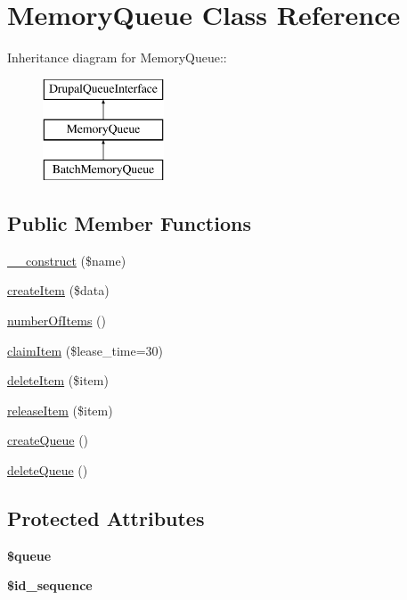 \hypertarget{classMemoryQueue}{
\section{MemoryQueue Class Reference}
\label{classMemoryQueue}
}
Inheritance diagram for MemoryQueue::\begin{figure}[H]
\begin{center}
\leavevmode
\includegraphics[height=3cm]{classMemoryQueue}
\end{center}
\end{figure}
\subsection*{Public Member Functions}
\begin{DoxyCompactItemize}
\item 
\hyperlink{classMemoryQueue_a83e620eced2895763ebad69f615462b2}{\_\-\_\-construct} (\$name)
\item 
\hyperlink{classMemoryQueue_a5d8fe8085407a1a77c505ba8532b9c50}{createItem} (\$data)
\item 
\hyperlink{classMemoryQueue_a266edfebcf6567707f3e2dafc3200491}{numberOfItems} ()
\item 
\hyperlink{classMemoryQueue_a24cba156a854a7b4b6c81c3d2614508d}{claimItem} (\$lease\_\-time=30)
\item 
\hyperlink{classMemoryQueue_a3091327204bb8b2e9c13baf32142f7f5}{deleteItem} (\$item)
\item 
\hyperlink{classMemoryQueue_ad835863a58ca48f31f8cb1e3807b88cf}{releaseItem} (\$item)
\item 
\hyperlink{classMemoryQueue_a94e1da7e8b4cccb445acb8500e0b39a5}{createQueue} ()
\item 
\hyperlink{classMemoryQueue_a055cd4bf4b319accf5ffa2c6f22685f1}{deleteQueue} ()
\end{DoxyCompactItemize}
\subsection*{Protected Attributes}
\begin{DoxyCompactItemize}
\item 
\hypertarget{classMemoryQueue_a7c2d4dee239a697d91541bc1ad580eb4}{
{\bfseries \$queue}}
\label{classMemoryQueue_a7c2d4dee239a697d91541bc1ad580eb4}

\item 
\hypertarget{classMemoryQueue_aead361610d119b99b7e9f11fd46e008a}{
{\bfseries \$id\_\-sequence}}
\label{classMemoryQueue_aead361610d119b99b7e9f11fd46e008a}

\end{DoxyCompactItemize}


